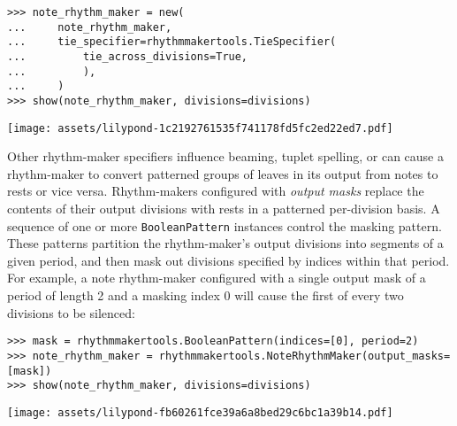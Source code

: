\begin{abjadbookoutput}
\begin{singlespacing}
\vspace{-0.5\baselineskip}
\begin{verbatim}
>>> note_rhythm_maker = new(
...     note_rhythm_maker,
...     tie_specifier=rhythmmakertools.TieSpecifier(
...         tie_across_divisions=True,
...         ),
...     )
>>> show(note_rhythm_maker, divisions=divisions)
\end{verbatim}
\noindent\texttt{[image: assets/lilypond-1c2192761535f741178fd5fc2ed22ed7.pdf]}
\end{singlespacing}
\end{abjadbookoutput}

\noindent Other rhythm-maker specifiers influence beaming, tuplet spelling, or
can cause a rhythm-maker to convert patterned groups of leaves in its output
from notes to rests or vice versa. Rhythm-makers configured with \emph{output
masks} replace the contents of their output divisions with rests in a patterned
per-division basis. A sequence of one or more \texttt{BooleanPattern} instances
control the masking pattern. These patterns partition the rhythm-maker's output
divisions into segments of a given period, and then mask out divisions
specified by indices within that period. For example, a note rhythm-maker
configured with a single output mask of a period of length 2 and a masking
index 0 will cause the first of every two divisions to be silenced:

\begin{comment}
<abjad>
mask = rhythmmakertools.BooleanPattern(indices=[0], period=2)
note_rhythm_maker = rhythmmakertools.NoteRhythmMaker(output_masks=[mask])
show(note_rhythm_maker, divisions=divisions)
</abjad>
\end{comment}

\begin{abjadbookoutput}
\begin{singlespacing}
\vspace{-0.5\baselineskip}
\begin{verbatim}
>>> mask = rhythmmakertools.BooleanPattern(indices=[0], period=2)
>>> note_rhythm_maker = rhythmmakertools.NoteRhythmMaker(output_masks=[mask])
>>> show(note_rhythm_maker, divisions=divisions)
\end{verbatim}
\noindent\texttt{[image: assets/lilypond-fb60261fce39a6a8bed29c6bc1a39b14.pdf]}
\end{singlespacing}
\end{abjadbookoutput}


